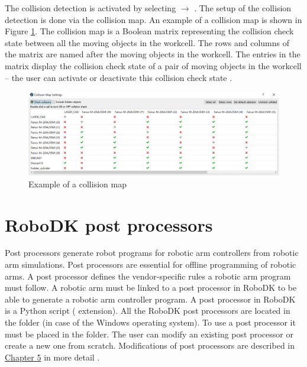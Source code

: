 The collision detection is activated by selecting  $\rightarrow$ . The setup of the collision detection is done via the collision map. An example of a collision map is shown in Figure \ref{fig:collisionmap}. The collision map is a Boolean matrix representing the collision check state between all the moving objects in the workcell. The rows and columns of the matrix are named after the moving objects in the workcell. The entries in the matrix display the collision check state of a pair of moving objects in the workcell -- the user can activate or deactivate this collision check state \cite{robodkcollision}.

\begin{figure}[h]
    \centering
    \includegraphics[width=1.0\linewidth]{img/collision_map.PNG}
    \caption{Example of a collision map}
    \label{fig:collisionmap}
\end{figure}

\section{RoboDK post processors}

Post processors generate robot programs for robotic arm controllers from robotic arm simulations. Post processors are essential for offline programming of robotic arms. A post processor defines the vendor-specific rules a robotic arm program must follow. A robotic arm must be linked to a post processor in RoboDK to be able to generate a robotic arm controller program. A post processor in RoboDK is a Python script ( extension). All the RoboDK post processors are located in the
 folder (in case of the Windows operating system).  To use a post processor it must be placed in the  folder. The user can modify an existing post processor or create a new one from scratch. Modifications of post processors are described in \hyperref[chap:implementation]{Chapter 5} in more detail \cite{robodkposts}. 
